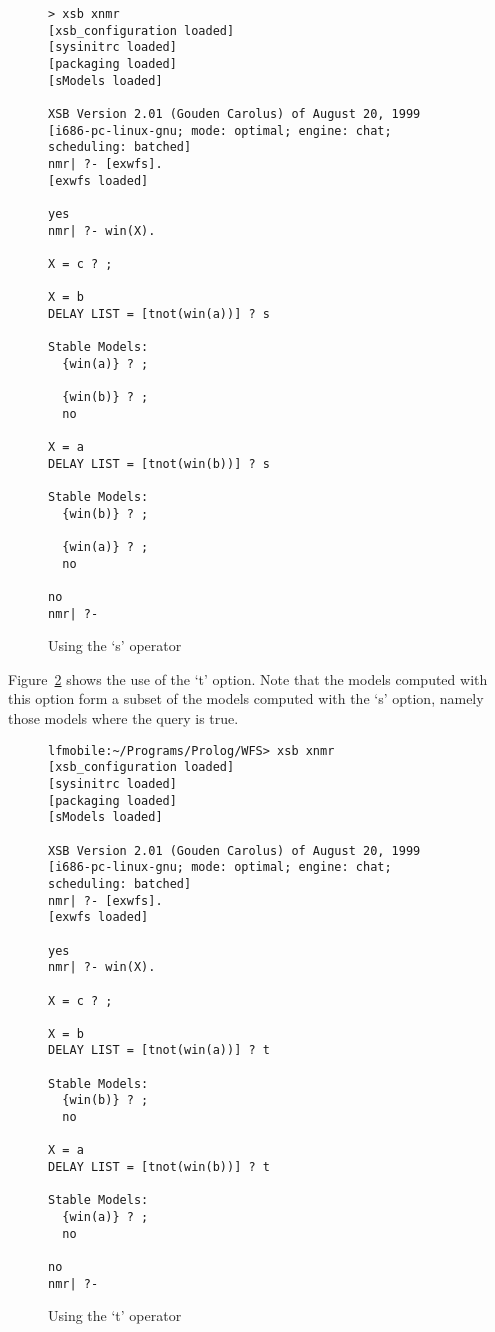 \begin{figure}
\label{fig:stable}
\centering
\scriptsize
\begin{verbatim}
> xsb xnmr
[xsb_configuration loaded]
[sysinitrc loaded]
[packaging loaded]
[sModels loaded]

XSB Version 2.01 (Gouden Carolus) of August 20, 1999
[i686-pc-linux-gnu; mode: optimal; engine: chat; scheduling: batched]
nmr| ?- [exwfs].
[exwfs loaded]

yes
nmr| ?- win(X).

X = c ? ;

X = b
DELAY LIST = [tnot(win(a))] ? s

Stable Models: 
  {win(a)} ? ;

  {win(b)} ? ;
  no

X = a
DELAY LIST = [tnot(win(b))] ? s

Stable Models: 
  {win(b)} ? ;

  {win(a)} ? ;
  no

no
nmr| ?- 
\end{verbatim}
\caption{Using the `s' operator}
\end{figure}


Figure~\ref{fig:tstable} shows the use of the `t' option. Note that
the models computed with this option form a subset of the models
computed with the `s' option, namely those models where the query is
true.

\begin{figure}
\label{fig:tstable}
\centering
\scriptsize
\begin{verbatim}
lfmobile:~/Programs/Prolog/WFS> xsb xnmr
[xsb_configuration loaded]
[sysinitrc loaded]
[packaging loaded]
[sModels loaded]

XSB Version 2.01 (Gouden Carolus) of August 20, 1999
[i686-pc-linux-gnu; mode: optimal; engine: chat; scheduling: batched]
nmr| ?- [exwfs].
[exwfs loaded]

yes
nmr| ?- win(X).

X = c ? ;

X = b
DELAY LIST = [tnot(win(a))] ? t

Stable Models: 
  {win(b)} ? ;
  no

X = a
DELAY LIST = [tnot(win(b))] ? t

Stable Models: 
  {win(a)} ? ;
  no

no
nmr| ?- 
\end{verbatim}
\caption{Using the `t' operator}
\end{figure}

